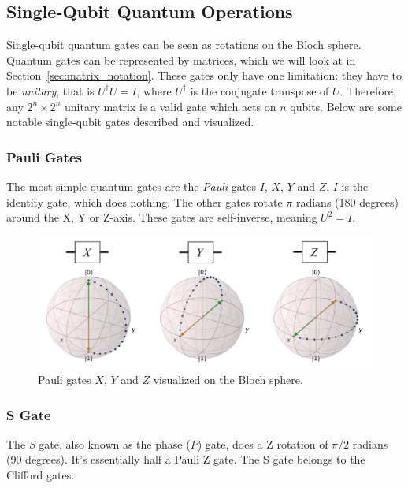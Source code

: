\documentclass[11pt]{article}
\begin{document}
\subsection{Single-Qubit Quantum Operations}
Single-qubit quantum gates can be seen as rotations on the Bloch sphere. Quantum gates can be represented by matrices, which we will look at in Section~\ref{sec:matrix_notation}. These gates only have one limitation: they have to be \emph{unitary}, that is $U^\dagger U = I$, where $U^\dagger$ is the conjugate transpose of $U$. Therefore, any $2^n \times 2^n$ unitary matrix is a valid gate which acts on $n$ qubits. Below are some notable single-qubit gates described and visualized.

\subsubsection{Pauli Gates}
 The most simple quantum gates are the \emph{Pauli} gates $I$, $X$, $Y$ and $Z$. $I$ is the identity gate, which does nothing. The other gates rotate $\pi$ radians (180 degrees) around the X, Y or Z-axis. These gates are self-inverse, meaning $U^2 = I$.

\begin{figure}[ht]
  \begin{adjustwidth}{-2.5cm}{-2.5cm}
  \centering
  \includegraphics[scale=0.25]{images/pauli_gates.eps}
  \caption{Pauli gates $X$, $Y$ and $Z$ visualized on the Bloch sphere.}
  \end{adjustwidth}
\end{figure}


\subsubsection{S Gate}
The \emph{S} gate, also known as the phase ($P$) gate, does a Z rotation of $\pi/2$ radians (90 degrees). It's essentially half a Pauli Z gate. The S gate belongs to the Clifford gates.
\end{document}
